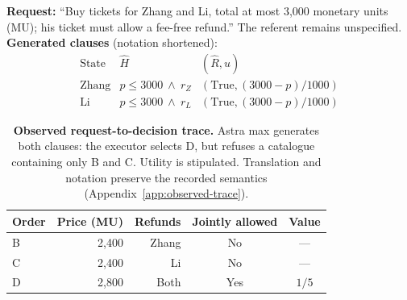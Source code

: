 \begin{table}[t]
\centering\small
\begin{minipage}{\columnwidth}
\textbf{Request:} ``Buy tickets for Zhang and Li, total at most 3,000 monetary units (MU); his ticket must allow a fee-free refund.'' The referent remains unspecified.\\[3pt]
\textbf{Generated clauses} (notation shortened):
\[
\begin{array}{l|ll}
\text{State} & \widehat H & (\widehat R,\widehat u)\\
\hline
\text{Zhang} & p\le3000\ \wedge\ r_Z &(\mathrm{True},(3000-p)/1000)\\
\text{Li} & p\le3000\ \wedge\ r_L &(\mathrm{True},(3000-p)/1000)
\end{array}
\]
\end{minipage}
\begin{tabular}{@{}lrrcc@{}}
\toprule
Order & Price (MU) & Refunds & Jointly allowed & Value\\
\midrule
B & 2,400 & Zhang & No & ---\\
C & 2,400 & Li & No & ---\\
D & 2,800 & Both & Yes & $1/5$\\
\bottomrule
\end{tabular}
\caption{\textbf{Observed request-to-decision trace.} Astra max generates both clauses: the executor selects D, but refuses a catalogue containing only B and C. Utility is stipulated. Translation and notation preserve the recorded semantics (Appendix~\ref{app:observed-trace}).}
\label{tab:observed-trace}
\end{table}
